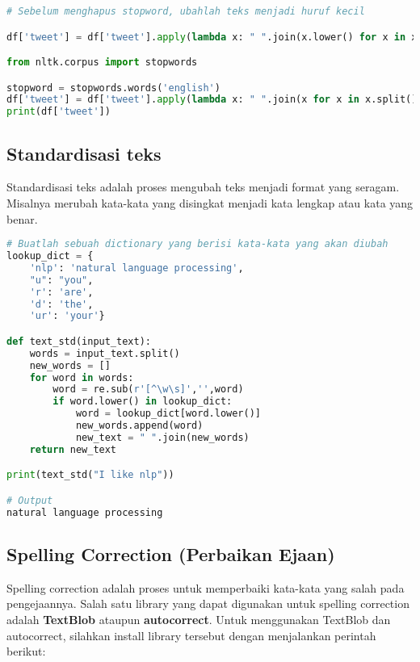 \documentclass{article}
\begin{document}
    \begin{lstlisting}[language=python, style=pythonstyle]
# Sebelum menghapus stopword, ubahlah teks menjadi huruf kecil

df['tweet'] = df['tweet'].apply(lambda x: " ".join(x.lower() for x in x.split()))

from nltk.corpus import stopwords

stopword = stopwords.words('english')
df['tweet'] = df['tweet'].apply(lambda x: " ".join(x for x in x.split() if x not in stop))
print(df['tweet'])
    \end{lstlisting}

    \subsection*{Standardisasi teks}

    Standardisasi teks adalah proses mengubah teks menjadi format yang seragam.
    Misalnya merubah kata-kata yang disingkat menjadi kata lengkap atau kata yang benar.

    \begin{lstlisting}[language=python, style=pythonstyle]
# Buatlah sebuah dictionary yang berisi kata-kata yang akan diubah
lookup_dict = {
    'nlp': 'natural language processing', 
    "u": "you", 
    'r': 'are', 
    'd': 'the', 
    'ur': 'your'}

def text_std(input_text):
    words = input_text.split()
    new_words = []
    for word in words:
        word = re.sub(r'[^\w\s]','',word)
        if word.lower() in lookup_dict:
            word = lookup_dict[word.lower()]
            new_words.append(word)
            new_text = " ".join(new_words)
    return new_text

print(text_std("I like nlp"))

# Output
natural language processing
    \end{lstlisting}

    \subsection*{Spelling Correction (Perbaikan Ejaan)}
    
    Spelling correction adalah proses untuk memperbaiki kata-kata yang salah pada pengejaannya.
    Salah satu library yang dapat digunakan untuk spelling correction adalah \textbf{TextBlob} ataupun \textbf{autocorrect}.
    Untuk menggunakan TextBlob dan autocorrect, silahkan install library tersebut dengan menjalankan perintah berikut:
\end{document}
